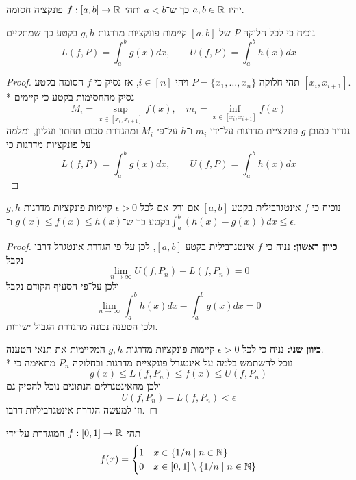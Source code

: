 \Question{}
יהיו $a, b \in \mathbb{R}$ כך ש־$a < b$ ותהי $f : [a, b] \to \mathbb{R}$ פונקציה חסומה.

\Subquestion{}
נוכיח כי לכל חלוקה $P$ של $[a, b]$ קיימות פונקציות מדרגות $g, h$ בקטע כך שמתקיים
\[
	L(f, P) = \int_{a}^{b} g(x) dx,
	\qquad
	U(f, P) = \int_{a}^{b} h(x) dx
\]
\begin{proof}
	תהי חלוקה $P = \{x_1, \dots, x_n\}$ ויהי $i \in [n]$, אז נסיק כי $f$ חסומה בקטע $[x_i, x_{i + 1}]$. \\*
	נסיק מהחסימות בקטע כי קיימים
	\[
		M_i = \sup_{x \in [x_i, x_{i + 1}]} f(x),
		\quad
		m_i = \inf_{x \in [x_i, x_{i + 1}]} f(x)
	\]
	נגדיר כמובן $g$ פונקציית מדרגות על־ידי $m_i$ ו־$h$ על־פי $M_i$ ומהגדרת סכום תחתון ועליון, ומלמה על פונקציות מדרגות כי
	\[
		L(f, P) = \int_{a}^{b} g(x) dx,
		\qquad
		U(f, P) = \int_{a}^{b} h(x) dx
	\]
\end{proof}

\Subquestion{}
נוכיח כי $f$ אינטגרבילית בקטע $[a, b]$ אם ורק אם לכל $\epsilon > 0$ קיימות פונקציות מדרגות $g, h$ בקטע כך ש־$g(x) \le f(x) \le h(x)$ ו־$\int_{a}^{b} (h(x) - g(x)) dx \le \epsilon$.
\begin{proof}
	\textbf{כיוון ראשון:}
	נניח כי $f$ אינטגרבילית בקטע $[a, b]$, לכן על־פי הגדרת אינטגרל דרבו נקבל
	\[
		\lim_{n \to \infty} U(f, P_n) - L(f, P_n) = 0
	\]
	ולכן על־פי הסעיף הקודם נקבל
	\[
		\lim_{n \to \infty} \int_{a}^{b} h(x) dx - \int_{a}^{b} g(x) dx = 0
	\]
	ולכן הטענה נכונה מהגדרת הגבול ישירות.

	\textbf{כיוון שני:}
	נניח כי לכל $\epsilon > 0$ קיימות פונקציות מדרגות $g, h$ המקיימות את תנאי הטענה. \\*
	נוכל להשתמש בלמה על אינטגרל פונקציית מדרגות ובחלוקה $P_n$ מתאימה כי
	\[
		g(x) \le L(f, P_n) \le f(x) \le U(f, P_n)
	\]
	ולכן מהאינטגרלים הנתונים נוכל להסיק גם
	\[
		U(f, P_n) - L(f, P_n) < \epsilon
	\]
	וזו למעשה הגדרת אינטגרביליות דרבו.
\end{proof}

\Question{}
תהי $f : [0, 1] \to \mathbb{R}$ המוגדרת על־ידי
\[
	f(x) = \begin{cases}
		1 & x \in \{ 1 / n \mid n \in \mathbb{N} \} \\
		0 & x \in [0, 1] \setminus \{ 1 / n \mid n \in \mathbb{N} \}
	\end{cases}
\]

